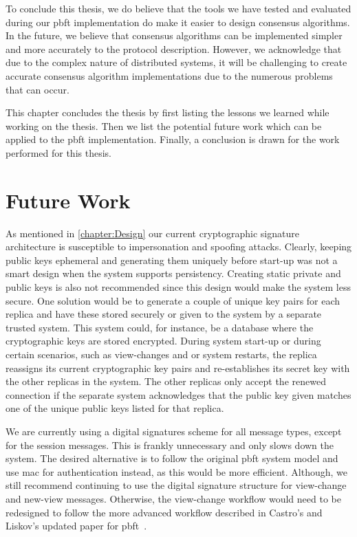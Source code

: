 To conclude this thesis, we do believe that the tools we have tested and evaluated during our \ac{pbft} implementation do make it easier to design consensus algorithms. In the future, we believe that consensus algorithms can be implemented simpler and more accurately to the protocol description. However, we acknowledge that due to the complex nature of distributed systems, it will be challenging to create accurate consensus algorithm implementations due to the numerous problems that can occur.
\fi

This chapter concludes the thesis by first listing the lessons we learned while working on the thesis. Then we list the potential future work which can be applied to the \ac{pbft} implementation.
Finally, a conclusion is drawn for the work performed for this thesis.



\section{Future Work}
As mentioned in \autoref{chapter:Design} our current cryptographic signature architecture is susceptible to impersonation and spoofing attacks. Clearly, keeping public keys ephemeral and generating them uniquely before start-up was not a smart design when the system supports persistency. Creating static private and public keys is also not recommended since this design would make the system less secure. One solution would be to generate a couple of unique key pairs for each replica and have these stored securely or given to the system by a separate trusted system. This system could, for instance, be a database where the cryptographic keys are stored encrypted. During system start-up or during certain scenarios, such as view-changes and or system restarts, the replica reassigns its current cryptographic key pairs and re-establishes its secret key with the other replicas in the system. The other replicas only accept the renewed connection if the separate system acknowledges that the public key given matches one of the unique public keys listed for that replica.

We are currently using a digital signatures scheme for all message types, except for the session messages. This is frankly unnecessary and only slows down the system. The desired alternative is to follow the original \ac{pbft} system model and use \ac{mac} for authentication instead, as this would be more efficient. Although, we still recommend continuing to use the digital signature structure for view-change and new-view messages. Otherwise, the view-change workflow would need to be redesigned to follow the more advanced workflow described in Castro’s and Liskov’s updated paper for \ac{pbft}~\cite[p.~410-414]{PAPER:PBFTRecovery}.

